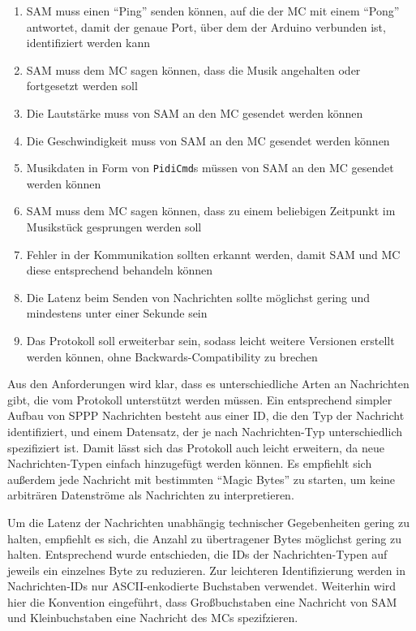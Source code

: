 \begin{enumerate}
    \item \ac{SAM} muss einen \enquote{Ping} senden können, auf die der \ac{MC} mit einem \enquote{Pong} antwortet, damit der genaue Port, über dem der Arduino verbunden ist, identifiziert werden kann
    \item \ac{SAM} muss dem \ac{MC} sagen können, dass die Musik angehalten oder fortgesetzt werden soll
    \item Die Lautstärke muss von \ac{SAM} an den \ac{MC} gesendet werden können
    \item Die Geschwindigkeit muss von \ac{SAM} an den \ac{MC} gesendet werden können
    \item Musikdaten in Form von \lstinline|PidiCmd|s müssen von \ac{SAM} an den \ac{MC} gesendet werden können
    \item \ac{SAM} muss dem \ac{MC} sagen können, dass zu einem beliebigen Zeitpunkt im Musikstück gesprungen werden soll
    \item Fehler in der Kommunikation sollten erkannt werden, damit \ac{SAM} und \ac{MC} diese entsprechend behandeln können
    \item Die Latenz beim Senden von Nachrichten sollte möglichst gering und mindestens unter einer Sekunde sein
    \item Das Protokoll soll erweiterbar sein, sodass leicht weitere Versionen erstellt werden können, ohne Backwards-Compatibility zu brechen
\end{enumerate}

Aus den Anforderungen wird klar, dass es unterschiedliche Arten an Nachrichten gibt, die vom Protokoll unterstützt werden müssen.
Ein entsprechend simpler Aufbau von \ac{SPPP} Nachrichten besteht aus einer ID, die den Typ der Nachricht identifiziert, und einem Datensatz, der je nach Nachrichten-Typ unterschiedlich spezifiziert ist. \newline
Damit lässt sich das Protokoll auch leicht erweitern, da neue Nachrichten-Typen einfach hinzugefügt werden können.
Es empfiehlt sich außerdem jede Nachricht mit bestimmten \enquote{Magic Bytes} zu starten, um keine arbiträren Datenströme als Nachrichten zu interpretieren.

Um die Latenz der Nachrichten unabhängig technischer Gegebenheiten gering zu halten, empfiehlt es sich, die Anzahl zu übertragener Bytes möglichst gering zu halten.
Entsprechend wurde entschieden, die IDs der Nachrichten-Typen auf jeweils ein einzelnes Byte zu reduzieren.
Zur leichteren Identifizierung werden in Nachrichten-IDs nur ASCII-enkodierte Buchstaben verwendet.
Weiterhin wird hier die Konvention eingeführt, dass Großbuchstaben eine Nachricht von \ac{SAM} und Kleinbuchstaben eine Nachricht des \ac{MC}s spezifzieren.

